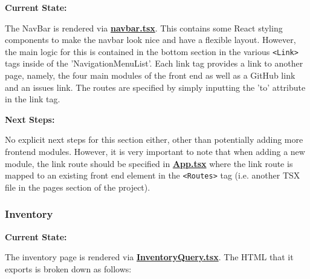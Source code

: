 \documentclass{article}
\begin{document}
\par{\textbf{Current State:}}
\par{The NavBar is rendered via \href{https://github.com/OCD-Rats-Capstone/OCD-Rat-Infrastructure/blob/main/src/ocd-rat-frontend/src/components/navbar.tsx}{\textbf{navbar.tsx}}. This contains some React styling
components to make the navbar look nice and have a flexible layout. However, the main logic for this is contained in the bottom section in the various \texttt{<Link>} tags inside of the 'NavigationMenuList'. Each
link tag provides a link to another page, namely, the four main modules of the front end as well as a GitHub link and an issues link. The routes are specified by simply inputting the 'to' attribute in the link tag.}
\newline
\par{\textbf{Next Steps:}}
\par{No explicit next steps for this section either, other than potentially adding more frontend modules. However, it is very important to note that when adding a new module, the link route should be specified in
\href{https://github.com/OCD-Rats-Capstone/OCD-Rat-Infrastructure/blob/main/src/ocd-rat-frontend/src/App.tsx}{\textbf{App.tsx}} where the link route is mapped to an existing front end element in the
\texttt{<Routes>} tag (i.e. another TSX file
in the pages section of the project).}

\subsubsection{Inventory}

\par{\textbf{Current State:}}
\par{The inventory page is rendered via \href{https://github.com/OCD-Rats-Capstone/OCD-Rat-Infrastructure/blob/main/src/ocd-rat-frontend/src/pages/InventoryQuery.tsx}{\textbf{InventoryQuery.tsx}}.
The HTML that it exports is broken down as follows:}
\end{document}
